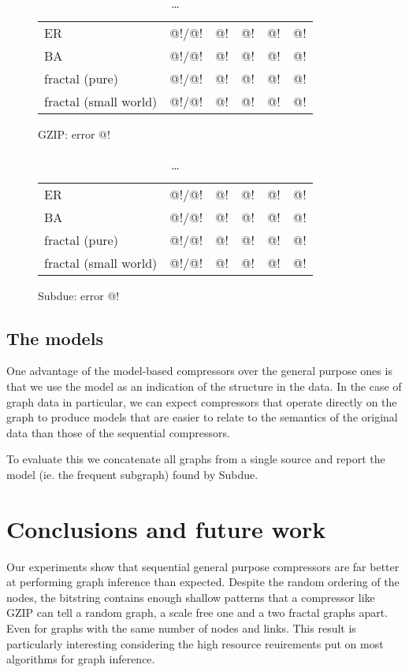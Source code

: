 \documentclass[10pt,a4paper,oneside]{article}
\begin{document}
\begin{table}[h]
\label{table:real-life}
\begin{subfigure}[b]{1\columnwidth}
\begin{tabular}{l | r | r r r r}
\hline
  ER      & @!/@!  & @! & @! & @! & @! \\
  BA      & @!/@!  & @! & @! & @! & @!\\
  fractal (pure) & @!/@!  & @! & @! & @! & @!\\
  fractal (small world) & @!/@!  & @! & @! & @! & @!\\
\hline
\end{tabular}
\caption{GZIP: error @!}
\end{subfigure}
\begin{subfigure}[b]{1\columnwidth}
\begin{tabular}{l | r | r r r r}
\hline
  ER      & @!/@!  & @! & @! & @! & @! \\
  BA      & @!/@!  & @! & @! & @! & @!\\
  fractal (pure) & @!/@!  & @! & @! & @! & @!\\
  fractal (small world)& @!/@! & @! & @! & @! & @!\\
\hline
\end{tabular}
\caption{Subdue: error @!}
\end{subfigure}
\caption{\ldots}
\end{table}

\subsection*{The models}

One advantage of the model-based compressors over the general purpose ones is that we use the model as an indication of the structure in the data. In the case of graph data in particular, we can expect compressors that operate directly on the graph to produce models that are easier to relate to the semantics of the original data than those of the sequential compressors. 

To evaluate this we concatenate all graphs from a single source and report the model (ie. the frequent subgraph) found by Subdue.

\section*{Conclusions and future work}

Our experiments show that sequential general purpose compressors are far better at performing graph inference than expected. Despite the random ordering of the nodes, the bitstring contains enough shallow patterns that a compressor like GZIP can tell a random graph, a scale free one and a two fractal graphs apart. Even for graphs with the same number of nodes and links. This result is particularly interesting considering the high resource reuirements put on most algorithms for graph inference. 
\end{document}
